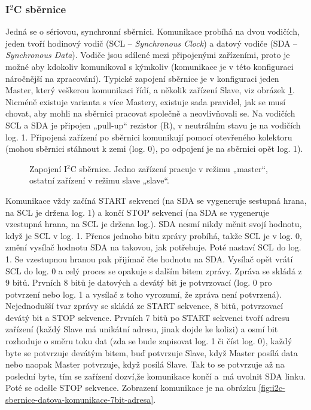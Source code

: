 \subsubsection{I$^2$C sběrnice}
Jedná se o sériovou, synchronní sběrnici. Komunikace probíhá na dvou vodičích, jeden tvoří hodinový vodič (SCL – \textit{Synchronous Clock}) a datový vodiče (SDA – \textit{Synchronous Data}). Vodiče jsou sdílené mezi připojenými zařízeními, proto je možné aby kdokoliv komunikoval s kýmkoliv (komunikace je v této konfiguraci náročnější na zpracování). Typické zapojení sběrnice je v konfiguraci jeden Master, který veškerou komunikaci řídí, a několik zařízení Slave, viz obrázek \ref{fig:i2c-sbernice}. Nicméně existuje varianta s více Mastery, existuje sada pravidel, jak se musí chovat, aby mohli na sběrnici pracovat společně a neovlivňovali se. Na vodičích SCL a SDA je připojen „pull-up“ rezistor (R), v neutrálním stavu je na vodičích log. 1. Připojená zařízení po sběrnici komunikují pomocí otevřeného kolektoru (mohou sběrnici stáhnout k zemi (log. 0), po odpojení je na sběrnici opět log. 1).

\begin{figure}[H]
    \centering
    \def\svgwidth{\columnwidth}
    
    \caption[Zapojení I$^2$C sběrnice.]{Zapojení I$^2$C sběrnice. Jedno zařízení pracuje v režimu „master“, ostatní zařízení v režimu slave „slave“.}
    \label{fig:i2c-sbernice}
\end{figure}

Komunikace vždy začíná START sekvencí (na SDA se vygeneruje sestupná hrana, na SCL je držena log. 1) a končí STOP sekvencí (na SDA se vygeneruje vzestupná hrana, na SCL je držena log.). SDA nesmí nikdy měnit svojí hodnotu, když je SCL v log. 1.  Přenos jednoho bitu zprávy probíhá, takže SCL je v log. 0, změní vysílač hodnotu SDA na takovou, jak potřebuje. Poté nastaví SCL do log. 1. Se vzestupnou hranou pak přijímač čte hodnotu na SDA. Vysílač opět vrátí SCL do log. 0 a celý proces se opakuje s dalším bitem zprávy. Zpráva se skládá z 9 bitů. Prvních 8 bitů je datových a devátý bit je potvrzovací (log. 0 pro potvrzení nebo log. 1 a vysílač z toho vyrozumí, že zpráva není potvrzená). Nejednodušší tvar zprávy se skládá ze START sekvence, 8 bitů, potvrzovací devátý bit a STOP sekvence. Prvních 7 bitů po START sekvenci tvoří adresu zařízení (každý Slave má unikátní adresu, jinak dojde ke kolizi) a osmí bit rozhoduje o směru toku dat (zda se bude zapisovat log. 1 či číst log. 0), každý byte se potvrzuje devátým bitem, buď potvrzuje Slave, když Master posílá data nebo naopak Master potvrzuje, když posílá Slave. Tak to se potvrzuje až na poslední byte, tím se zařízení dozví,že komunikace končí a~má uvolnit SDA linku. Poté se odešle STOP sekvence. Zobrazení komunikace je na obrázku \ref{fig:i2c-sbernice-datova-komunikace-7bit-adresa}.

